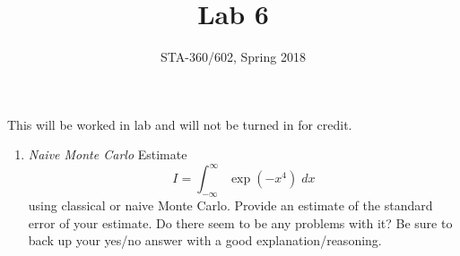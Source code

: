 \documentclass{article}
\begin{document}
\title{Lab 6}
\author{STA-360/602, Spring 2018}
\maketitle

This will be worked in lab and will not be turned in for credit. 


\begin{enumerate}
\item \emph{Naive Monte Carlo}
Estimate 
$$ I = \int_{-\infty}^{\infty} \exp(-x^4) \; dx$$ using classical or naive Monte Carlo. 
Provide an estimate of the standard error of your estimate. Do there seem to be any problems with it? Be sure to back up your yes/no answer with a good explanation/reasoning.



  
\end{enumerate}
\end{document}
